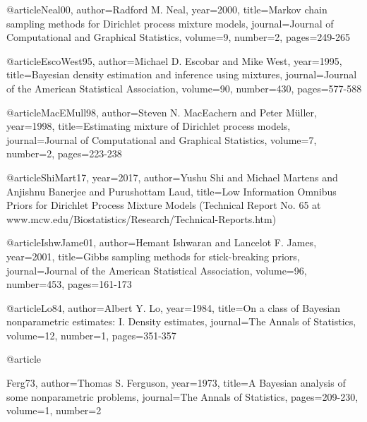 @article{Neal00,
	author={Radford M. Neal},
	year={2000},
	title={Markov chain sampling methods for {D}irichlet process mixture models},
	journal={Journal of Computational and Graphical Statistics},
	volume={9},
	number={2},
	pages={249-265}
}

@article{EscoWest95,
	author={Michael D. Escobar and Mike West},
	year={1995},
	title={Bayesian density estimation and inference using mixtures},
	journal={Journal of the American Statistical Association},
	volume={90},
	number={430},
	pages={577-588}
}

@article{MacEMull98,
	author={Steven N. MacEachern and Peter M{\"u}ller},
	year={1998},
	title={Estimating mixture of {D}irichlet process models},
	journal={Journal of Computational and Graphical Statistics},
	volume={7},
	number={2},
	pages={223-238}
}

@article{ShiMart17,
	year={2017},
	author={Yushu Shi and Michael Martens and Anjishnu Banerjee and Purushottam Laud},
	title={Low Information Omnibus Priors for {D}irichlet Process Mixture Models (Technical Report No. 65 at www.mcw.edu/Biostatistics/Research/Technical-Reports.htm)}
}

@article{IshwJame01,
	author={Hemant Ishwaran and Lancelot F. James},
	year={2001},
	title={Gibbs sampling methods for stick-breaking priors},
	journal={Journal of the American Statistical Association},
	volume={96},
	number={453},
	pages={161-173}
}

@article{Lo84,
	author={Albert Y. Lo},
	year={1984},
	title={On a class of {B}ayesian nonparametric estimates: I. Density estimates},
	journal={The Annals of Statistics},
	volume={12},
	number={1},
	pages={351-357}
}

@article{Ferg73,
	author={Thomas S. Ferguson},
	year={1973},
	title={A {B}ayesian analysis of some nonparametric problems},
	journal={The Annals of Statistics},
	pages={209-230},
	volume={1},
	number={2}
	
}

